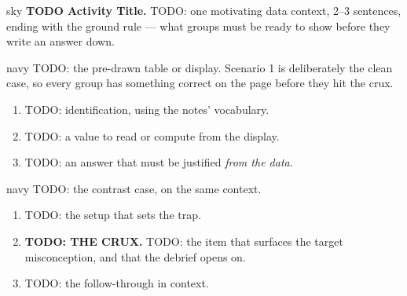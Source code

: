 \documentclass[10pt]{article}
\newcommand{\answerspace}[2]{\par\nopagebreak\noindent\begin{minipage}[t][#1][t]{\linewidth}%
  \color{keyred}\bfseries #2\end{minipage}\par}
\begin{document}

\vspace{0.10in}

\boxguard[10]
\begin{headlinebox}{sky}
\small
\textbf{TODO Activity Title.} TODO: one motivating data context, 2--3 sentences, ending with
the ground rule --- what groups must be ready to show before they write an answer down.
\end{headlinebox}

\vspace{0.10in}

\boxguard[28]
\begin{scenariobox}{navy}
\small
TODO: the pre-drawn table or display. Scenario 1 is deliberately the clean case, so every
group has something correct on the page before they hit the crux.

\vspace{6pt}
\begin{enumerate}[label=\textbf{\alph*.}, leftmargin=1.8em, itemsep=5pt]
  \item TODO: identification, using the notes' vocabulary. \blank{3.0cm}
  \item TODO: a value to read or compute from the display.
  \item TODO: an answer that must be justified \emph{from the data}.
        \answerspace{1.5cm}{}
\end{enumerate}
\end{scenariobox}

\vspace{0.10in}

\boxguard[26]
\begin{scenariobox}{navy}
\small
TODO: the contrast case, on the same context.

\vspace{6pt}
\begin{enumerate}[label=\textbf{\alph*.}, leftmargin=1.8em, itemsep=5pt]
  \item TODO: the setup that sets the trap.
  \item \textbf{TODO: THE CRUX.} TODO: the item that surfaces the target misconception, and
        that the debrief opens on.
        \answerspace{1.8cm}{}
  \item TODO: the follow-through in context.
        \answerspace{1.8cm}{}
\end{enumerate}
\end{scenariobox}
\end{document}
